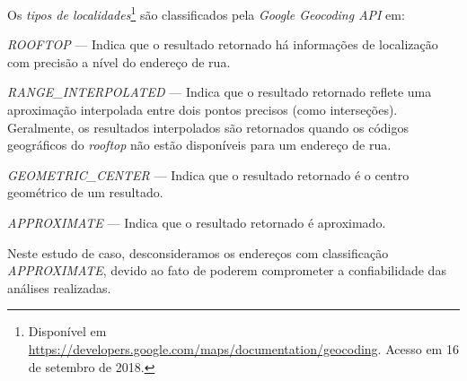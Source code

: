 \documentclass[
	12pt,				%
	oneside,			%
	a4paper,			%
	english,			%
	brazil				%
	]{abntex2ppgsi}
\begin{document}
{{Os \textit{tipos de localidades}\footnote{Disponível em \url{https://developers.google.com/maps/documentation/geocoding}. Acesso em 16 de setembro de 2018.} são classificados pela \textit{Google Geocoding API} em:
\begin{enumerate*}
\item \textit{ROOFTOP} --- Indica que o resultado retornado há informações de localização com precisão a nível do endereço de rua.
\item \textit{RANGE\_INTERPOLATED} --- Indica que o resultado retornado reflete uma aproximação interpolada entre dois pontos precisos (como interseções). Geralmente, os resultados interpolados são retornados quando os códigos geográficos do \textit{rooftop} não estão disponíveis para um endereço de rua.
\item \textit{GEOMETRIC\_CENTER} --- Indica que o resultado retornado é o centro geométrico de um resultado.
\item \textit{APPROXIMATE} --- Indica que o resultado retornado é aproximado.
\end{enumerate*}

Neste estudo de caso, desconsideramos os endereços com classificação \textit{APPROXIMATE}, devido ao fato de poderem comprometer a confiabilidade das análises realizadas. 

}}
\end{document}
